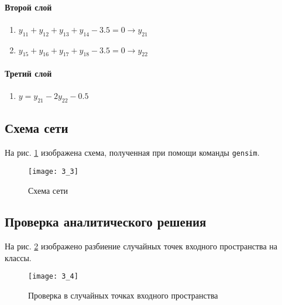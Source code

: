 \paragraph{Второй слой}
\begin{enumerate}
	\item $y_{11} + y_{12} + y_{13} + y_{14} - 3.5 = 0 \rightarrow y_{21}$
	\item $y_{15} + y_{16} + y_{17} + y_{18} - 3.5 = 0 \rightarrow y_{22}$
\end{enumerate}

\paragraph{Третий слой}
\begin{enumerate}
	\item $y = y_{21} - 2 y_{22} - 0.5$
\end{enumerate}

\subsection{Схема сети}


На рис. \ref{fig:3_3} изображена схема, полученная при помощи команды \verb+gensim+.

\begin{figure}[H]
\begin{center}
	\texttt{[image: 3\_3]}
	\caption{Схема сети}
	\label{fig:3_3}
\end{center}
\end{figure}

\newpage

\subsection{Проверка аналитического решения}


На рис. \ref{fig:3_4} изображено разбиение случайных точек входного пространства на классы.

\begin{figure}[H]
\begin{center}
	\texttt{[image: 3\_4]}
	\caption{Проверка в случайных точках входного пространства}
	\label{fig:3_4}
\end{center}
\end{figure}

